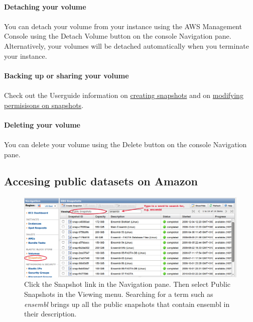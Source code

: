 \paragraph{Detaching your volume}
\paragraph{}You can detach your volume from your instance using the AWS Management Console using the Detach Volume button on the console Navigation pane. Alternatively, your volumes will be detached automatically when you terminate your instance.

\paragraph{Backing up or sharing your volume}
\paragraph{}Check out the Userguide information on \href{http://docs.amazonwebservices.com/AWSEC2/latest/UserGuide/creating-snapshot-ebs.html}{creating snapshots} and on \href{http://docs.amazonwebservices.com/AWSEC2/latest/UserGuide/modifying-snapshot-permissions-ebs.html}{modifying permisisons on snapshots}.


\paragraph{Deleting your volume}
\paragraph{}You can delete your volume using the Delete button on the console Navigation pane. 

\subsection{Accesing public datasets on Amazon}

\begin{figure}[!hd]
	\fbox
	{
		\begin{minipage}{13cm}
\includegraphics[width=\maxwidth]{"images/public-ensembl"}
\caption[List public data]{\label{fig:ensembl}Click the Snapshot link in the Navigation pane. Then select Public Snapshots in the Viewing menu. Searching for a term such as \emph{ensembl} brings up all the public snapshots that contain ensembl in their description. }
		\end{minipage}
	}
\end{figure}

